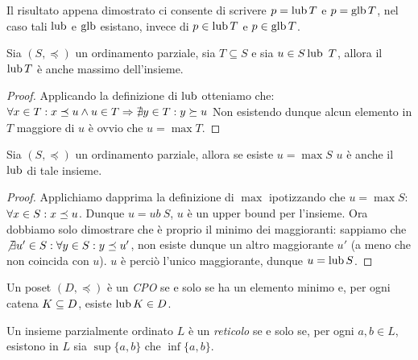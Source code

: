 Il risultato appena dimostrato ci consente di scrivere $p = \mathop{\mathrm{lub}}\nolimits T$ e
$p = \mathop{\mathrm{glb}}\nolimits T$, nel caso tali $\mathop{\mathrm{lub}}\nolimits$ e $\mathop{\mathrm{glb}}\nolimits$ esistano,
invece di $p \in \mathop{\mathrm{lub}}\nolimits T$ e $p \in \mathop{\mathrm{glb}}\nolimits T$.

\begin{proposizione} 
Sia $(S, \preceq)$ un ordinamento parziale, sia $T \subseteq S$ e sia $u \in S \mathop{\mathrm{lub}}\nolimits\ T$, allora il $\mathop{\mathrm{lub}}\nolimits T$ è anche massimo dell'insieme.
\end{proposizione}
\begin{proof}
Applicando la definizione di $\mathop{\mathrm{lub}}\nolimits$ otteniamo che:
$\forall x \in T \mathrel{:} x \preceq u \land u \in T \Rightarrow \nexists y \in T \mathrel{:} y \succeq u$
Non esistendo dunque alcun elemento in $T$ maggiore di $u$ è ovvio che $u = \max T$.
\end{proof}

\begin{proposizione} 
Sia $(S, \preceq)$ un ordinamento parziale, allora se esiste $u = \max S$ $u$ è anche il $\mathop{\mathrm{lub}}\nolimits$ di tale insieme.
\end{proposizione}
\begin{proof}
Applichiamo dapprima la definizione di $\max$ ipotizzando che $u = \max S$:
$\forall x \in S \mathrel{:} x \preceq u$. Dunque $u = ub\ S$, $u$ è un upper bound per l'insieme. Ora dobbiamo solo dimostrare che è proprio il minimo dei maggioranti: sappiamo che $\not \exists u' \in S \mathrel{:} \forall y \in S \mathrel{:} y \preceq u'$, non esiste dunque un altro maggiorante $u'$ (a meno che non coincida con $u$). $u$ è perciò l'unico maggiorante, dunque $u = \mathop{\mathrm{lub}}\nolimits S$.
\end{proof}


\begin{definizione} 
\label{def:cpo}
Un poset $(D, \preceq)$ \`e un \emph{CPO} se e solo se
ha un elemento minimo e, per ogni catena $K \subseteq D$, esiste $\mathop{\mathrm{lub}}\nolimits K \in D$.
\end{definizione}

\begin{definizione}  
\label{def:reticolo2}
Un insieme parzialmente ordinato $L$ \`e un \emph{reticolo} se e solo se,
per ogni $a, b \in L$, esistono in $L$ sia $\sup\{a,b\}$ che $\inf\{a,b\}$.
\end{definizione}

